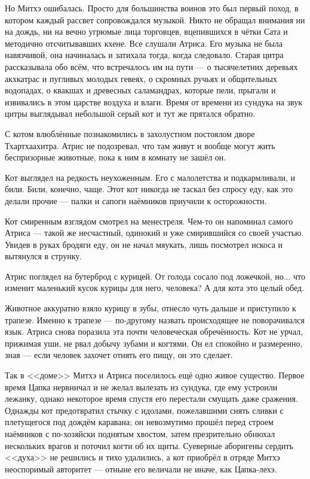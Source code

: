 Но Митхэ ошибалась.
Просто для большинства воинов это был первый поход, в котором каждый рассвет сопровождался музыкой.
Никто не обращал внимания ни на дождь, ни на вечно угрюмые лица торговцев, вцепившихся в чётки Сата и методично отсчитывавших кхене.
Все слушали Атриса.
Его музыка не была навязчивой, она начиналась и затихала тогда, когда следовало.
Старая цитра рассказывала обо всём, что встречалось им на пути --- о тысячелетних деревьях акхкатрас и пугливых молодых гевеях, о скромных ручьях и общительных водопадах, о квакшах и древесных саламандрах, которые пели, прыгали и извивались в этом царстве воздуха и влаги.
Время от времени из сундука на звук цитры выглядывал небольшой серый кот и тут же прятался обратно.

С котом влюблённые познакомились в захолустном постоялом дворе Тхартхаахитра.
Атрис не подозревал, что там живут и вообще могут жить беспризорные животные, пока к ним в комнату не зашёл он.

Кот выглядел на редкость неухоженным.
Его с малолетства и подкармливали, и били.
Били, конечно, чаще.
Этот кот никогда не таскал без спросу еду, как это делали прочие --- палки и сапоги наёмников приучили к осторожности.

Кот смиренным взглядом смотрел на менестреля.
Чем-то он напоминал самого Атриса --- такой же несчастный, одинокий и уже смирившийся со своей участью.
Увидев в руках бродяги еду, он не начал мяукать, лишь посмотрел искоса и вытянулся в струнку.

Атрис поглядел на бутерброд с курицей.
От голода сосало под ложечкой, но... что изменит маленький кусок курицы для него, человека?
А для кота это целый обед.

Животное аккуратно взяло курицу в зубы, отнесло чуть дальше и приступило к трапезе.
Именно к трапезе --- по-другому назвать происходящее не поворачивался язык.
Атриса снова поразила эта почти человеческая обречённость.
Кот не урчал, прижимая уши, не рвал добычу зубами и когтями.
Он ел спокойно и размеренно, зная --- если человек захочет отнять его пищу, он это сделает.

Так в <<доме>> Митхэ и Атриса поселилось ещё одно живое существо.
Первое время Цапка нервничал и не желал вылезать из сундука, где ему устроили лежанку, однако некоторое время спустя его перестали смущать даже сражения.
Однажды кот предотвратил стычку с идолами, пожелавшими снять сливки с плетущегося под дождём каравана;
он невозмутимо прошёл перед строем наёмников с по-хозяйски поднятым хвостом, затем презрительно обнюхал нескольких врагов и поточил когти об их щиты.
Суеверные аборигены сердить <<духа>> не решились и тихо удалились, а кот приобрёл в отряде Митхэ неоспоримый авторитет --- отныне его величали не иначе, как Цапка-лехэ.

